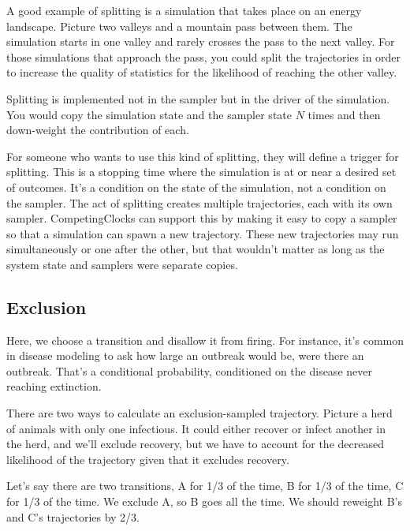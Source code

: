 \documentclass{article}
\begin{document}
A good example of splitting is a simulation that takes place on an energy landscape. Picture two valleys and a mountain pass between them. The simulation starts in one valley and rarely crosses the pass to the next valley. For those simulations that approach the pass, you could split the trajectories in order to increase the quality of statistics for the likelihood of reaching the other valley.

Splitting is implemented not in the sampler but in the driver of the simulation. You would copy the simulation state and the sampler state $N$ times and then down-weight the contribution of each.

For someone who wants to use this kind of splitting, they will define a trigger for splitting. This is a stopping time where the simulation is at or near a desired set of outcomes. It's a condition on the state of the simulation, not a condition on the sampler. The act of splitting creates multiple trajectories, each with its own sampler. CompetingClocks can support this by making it easy to copy a sampler so that a simulation can spawn a new trajectory. These new trajectories may run simultaneously or one after the other, but that wouldn't matter as long as the system state and samplers were separate copies.


\subsection{Exclusion}

Here, we choose a transition and disallow it from firing. For instance, it's common in disease modeling to ask how large an outbreak would be, were there an outbreak. That's a conditional probability, conditioned on the disease never reaching extinction. 

There are two ways to calculate an exclusion-sampled trajectory. Picture a herd of animals with only one infectious. It could either recover or infect another in the herd, and we'll exclude recovery, but we have to account for the decreased likelihood of the trajectory given that it excludes recovery.

Let's say there are two transitions, A for 1/3 of the time, B for 1/3 of the time, C for 1/3 of the time. We exclude A, so B goes all the time. We should reweight B's and C's trajectories by 2/3.
\end{document}
